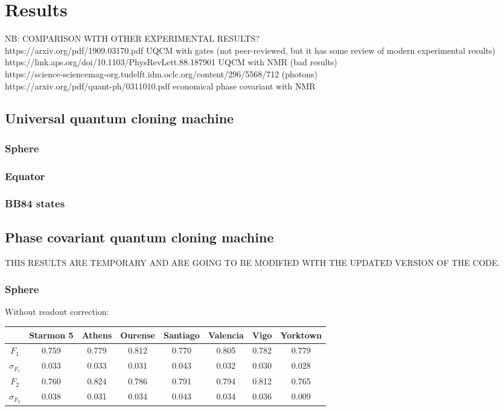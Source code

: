 \chapter{Results}
\label{sec:results}
NB: COMPARISON WITH OTHER EXPERIMENTAL RESULTS?\\
https://arxiv.org/pdf/1909.03170.pdf UQCM with gates (not peer-reviewed, but it has some review of modern experimental results)\\
https://link.aps.org/doi/10.1103/PhysRevLett.88.187901 UQCM with NMR (bad results)\\
https://science-sciencemag-org.tudelft.idm.oclc.org/content/296/5568/712 (photons)\\
https://arxiv.org/pdf/quant-ph/0311010.pdf economical phase covariant with NMR\\

\section{Universal quantum cloning machine}
\subsection{Sphere}
\subsection{Equator}
\subsection{BB84 states}
\section{Phase covariant quantum cloning machine}
THIS RESULTS ARE TEMPORARY AND ARE GOING TO BE MODIFIED WITH THE UPDATED VERSION OF THE CODE.
\subsection{Sphere}


Without readout correction:
\begin{table}[H]
    \centering
    \begin{tabular}{|c|c|c|c|c|c|c|c|}
    \hline
    \textbf{} & \textbf{Starmon 5} & \textbf{Athens} & \textbf{Ourense} & \textbf{Santiago} & \textbf{Valencia} & \textbf{Vigo} & \textbf{Yorktown} \\ \hline
    $F_1$              & 0.759 & 0.779 & 0.812 & 0.770 & 0.805 & 0.782 & 0.779 \\ \hline
    $\sigma_{F_1}$     & 0.033 & 0.033 & 0.031 & 0.043 & 0.032 & 0.030 & 0.028 \\ \hline
    $F_2$              & 0.760 & 0.824 & 0.786 & 0.791 & 0.794 & 0.812 & 0.765 \\ \hline
    $\sigma_{F_2}$     & 0.038 & 0.031 & 0.034 & 0.043 & 0.034 & 0.036 & 0.009 \\ \hline
    \end{tabular}
\end{table}

